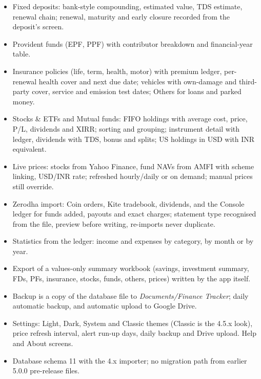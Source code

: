 \documentclass{article}
\begin{document}
\begin{itemize}
        \item Fixed deposits: bank-style compounding, estimated value, TDS estimate, renewal chain; renewal, maturity and early closure recorded from the deposit's screen.
        \item Provident funds (EPF, PPF) with contributor breakdown and financial-year table.
        \item Insurance policies (life, term, health, motor) with premium ledger, per-renewal health cover and next due date; vehicles with own-damage and third-party cover, service and emission test dates; Others for loans and parked money.
        \item Stocks \& ETFs and Mutual funds: FIFO holdings with average cost, price, P/L, dividends and XIRR; sorting and grouping; instrument detail with ledger, dividends with TDS, bonus and splits; US holdings in USD with INR equivalent.
        \item Live prices: stocks from Yahoo Finance, fund NAVs from AMFI with scheme linking, USD/INR rate; refreshed hourly/daily or on demand; manual prices still override.
        \item Zerodha import: Coin orders, Kite tradebook, dividends, and the Console ledger for funds added, payouts and exact charges; statement type recognised from the file, preview before writing, re-imports never duplicate.
        \item Statistics from the ledger: income and expenses by category, by month or by year.
        \item Export of a values-only summary workbook (savings, investment summary, FDs, PFs, insurance, stocks, funds, others, prices) written by the app itself.
        \item Backup is a copy of the database file to \textit{Documents/Finance Tracker}; daily automatic backup, and automatic upload to Google Drive.
        \item Settings: Light, Dark, System and Classic themes (Classic is the 4.5.x look), price refresh interval, alert run-up days, daily backup and Drive upload.
        Help and About screens.
        \item Database schema 11 with the 4.x importer; no migration path from earlier 5.0.0 pre-release files.
    \end{itemize}
\end{document}
